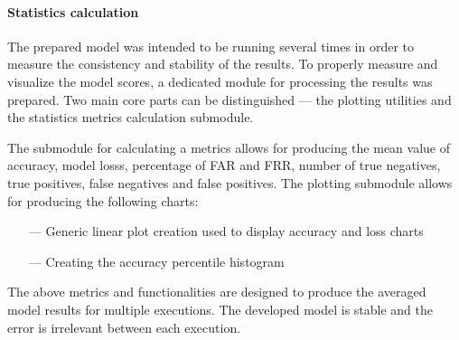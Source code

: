 \paragraph{Statistics calculation}\label{para:statistics-calculation}
The prepared model was intended to be running several times in order to measure the consistency and stability of the results.
To properly measure and visualize the model scores, a dedicated module for processing the results was prepared.
Two main core parts can be distinguished --- the plotting utilities and the statistics metrics calculation submodule.

The submodule for calculating a metrics allows for producing the mean value of accuracy, model losss, percentage of FAR and FRR, number of true negatives, true positives, false negatives and false positives.
The plotting submodule allows for producing the following charts:
\begin{samepage}
    \begin{itemize}
        \item[---] Generic linear plot creation used to display accuracy and loss charts
        \item[---] Creating the accuracy percentile histogram
    \end{itemize}
\end{samepage}

The above metrics and functionalities are designed to produce the averaged model results for multiple executions.
The developed model is stable and the error is irrelevant between each execution.
